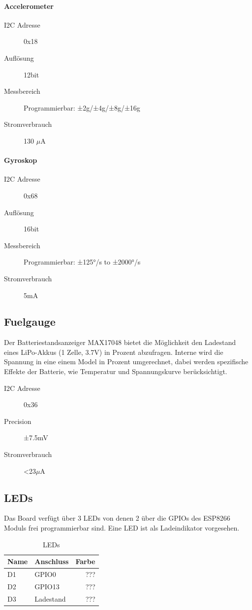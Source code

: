\documentclass[10pt, a4paper, onecolumn]{article} %
\begin{document}
\paragraph{Accelerometer}
\begin{description}
	\item[I2C Adresse] 0x18
	\item[Auflösung] 12bit
	\item[Messbereich ] Programmierbar:  ±2g/±4g/±8g/±16g
	\item[Stromverbrauch] 130 $\mu$A
\end{description}
\paragraph{Gyroskop}
\begin{description}
\item[I2C Adresse] 0x68
\item[Auflösung] 16bit
\item[Messbereich ] Programmierbar:  ±125°/s to ±2000°/s
\item[Stromverbrauch] 5mA 
\end{description}
\subsection{Fuelgauge}
\label{fuelgauge}
Der Batteriestandsanzeiger MAX17048 bietet die Möglichkeit den Ladestand eines LiPo-Akkus (1 Zelle, 3.7V) in Prozent abzufragen.  Interne wird die Spannung in eine einem Model in Prozent umgerechnet, dabei werden spezifische Effekte der Batterie, wie Temperatur und Spannungskurve berücksichtigt.
\begin{description}
		\item[I2C Adresse] 0x36
	\item[Precision]  ±7.5mV
	\item[Stromverbrauch] <23$\mu$A
\end{description}

\subsection{LEDs}
\label{LEDs}
Das Board verfügt über 3 LEDs von denen 2 über die GPIOs des ESP8266 Moduls frei programmierbar sind. Eine LED ist als Ladeindikator vorgesehen.

\begin{table}[h]
	\caption{LEDs}
	\centering
	\begin{tabular}{llr}
		Name & Anschluss & Farbe \\
		\midrule
		D1 & GPIO0 & ??? \\
		D2 & GPIO13 & ??? \\
		D3 & Ladestand & ??? \\
		\bottomrule
	\end{tabular}
\end{table}
\end{document}
